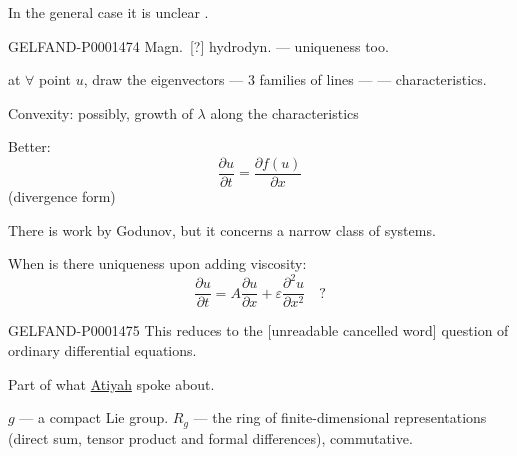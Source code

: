 In the general case it is unclear .

\begin{GelfandAdjacentEvidence}{GELFAND-P000147}{4}
Magn.\, [?] hydrodyn. — uniqueness too.
\end{GelfandAdjacentEvidence}

 at $\forall$ point $u$, draw the eigenvectors — 3 families of lines — — characteristics.

Convexity: possibly, growth of $\lambda$ along the characteristics

Better:
\begin{equation*}
\frac{\partial u}{\partial t}=\frac{\partial f (u)}{\partial x}
\end{equation*}
(divergence form)

There is work by Godunov, but it concerns a narrow class of systems.

When is there uniqueness upon adding viscosity:
\begin{equation*}
\frac{\partial u}{\partial t}=A\frac{\partial u}{\partial x}+\varepsilon\frac{\partial^2u}{\partial x^2}\quad?
\end{equation*}

\begin{GelfandAdjacentEvidence}{GELFAND-P000147}{5}
This reduces to the [unreadable cancelled word] question of ordinary differential equations.
\end{GelfandAdjacentEvidence}




Part of what \underline{Atiyah} spoke about.

$g$ — a compact Lie group. $R_g$ — the ring of finite-dimensional representations
(direct sum, tensor product and formal differences), commutative.

